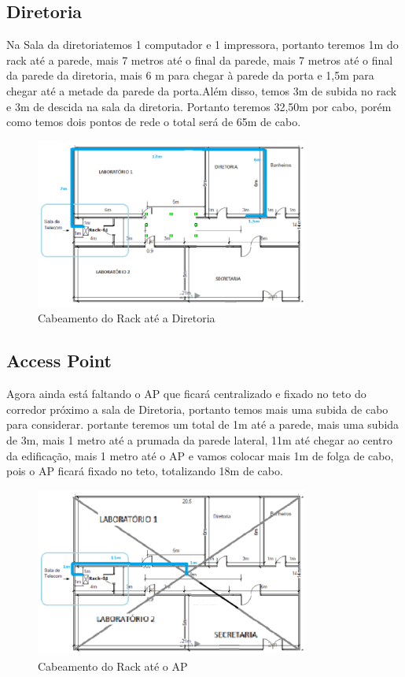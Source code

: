 \documentclass[	DIV=calc,%
							paper=a4,%
							fontsize=12pt,%
							onecolumn]{scrartcl}	 					%
\begin{document}
\subsection{Diretoria}
Na Sala da diretoriatemos 1 computador e 1 impressora, portanto teremos 1m do rack até a parede, mais 7 metros até o final da parede, mais 7 metros até o final da parede da diretoria, mais 6 m para chegar à parede da porta e 1,5m para chegar até a metade da parede da porta.Além disso, temos 3m de subida no rack e 3m de descida na sala da diretoria. Portanto teremos 32,50m por cabo, porém como temos dois pontos de rede o total será de 65m de cabo.
\begin{figure}[H]
	\centering
	\includegraphics[width=0.8\textwidth]{fig10}
	\caption{Cabeamento do Rack até a Diretoria}
	\label{fig10}
\end{figure}

\subsection{Access Point}
Agora ainda está faltando o AP que ficará centralizado e fixado no teto do corredor próximo a sala de Diretoria, portanto temos mais uma subida de cabo para considerar. portante teremos um total de 1m até a parede, mais uma subida de 3m, mais 1 metro até a prumada da parede lateral, 11m até chegar ao centro da edificação, mais 1 metro até o AP e vamos colocar mais 1m de folga de cabo, pois o AP ficará fixado no teto, totalizando 18m de cabo.
\begin{figure}[H]
	\centering
	\includegraphics[width=0.8\textwidth]{fig11}
	\caption{Cabeamento do Rack até o AP}
	\label{fig11}
\end{figure}
\end{document}
